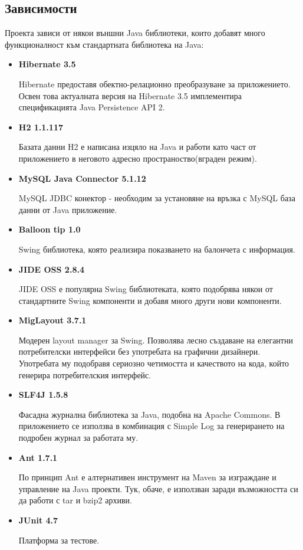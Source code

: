 \subsection{Зависимости}
Проекта зависи от някои външни Java библиотеки, които добавят много
функционалност към стандартната библиотека на Java:

\begin{itemize}
  \item \textbf{Hibernate 3.5}

    Hibernate предоставя обектно-релационно преобразуване за
    приложението. Освен това актуалната версия на Hibernate 3.5
    имплементира спецификацията Java Persistence API 2.
  \item \textbf{H2 1.1.117}

    Базата данни H2 е написана изцяло на Java и работи като част от
    приложението в неговото адресно пространоство(вграден режим).
  \item \textbf{MySQL Java Connector 5.1.12}

    MySQL JDBC конектор - необходим за установяне на връзка с MySQL
    база данни от Java приложение.
  \item \textbf{Balloon tip 1.0}

    Swing библиотека, която реализира показването на балончета с
    информация. 
  \item \textbf{JIDE OSS 2.8.4}

    JIDE OSS е популярна Swing библиотеката, която подобрява някои от
    стандартните Swing компоненти и добавя много други нови компоненти.
  \item \textbf{MigLayout 3.7.1}

    Модерен layout manager за Swing. Позволява лесно създаване на
    елегантни потребителски интерфейси без употребата на графични
    дизайнери. Употребата му подобравя сериозно четимостта и
    качеството на кода, който генерира потребителския интерфейс.
  \item \textbf{SLF4J 1.5.8}

    Фасадна журнална библиотека за Java, подобна на Apache Commons. В
    приложението се използва в комбинация с Simple Log за генерирането
    на подробен журнал за работата му.
  \item \textbf{Ant 1.7.1}

    По принцип Ant е алтернативен инструмент на Maven за изграждане и
    управление на Java проекти. Тук, обаче, е използван заради
    възможността си да работи с tar и bzip2 архиви.
  \item \textbf{JUnit 4.7}

    Платформа за тестове.
\end{itemize}
